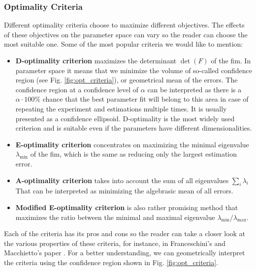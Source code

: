 \documentclass[10pt,A4paper]{article}
\begin{document}
\subsubsection*{Optimality Criteria}
Different optimality criteria choose to maximize different objectives.
The effects of these objectives on the parameter space can vary so the reader can choose the most suitable one. 
Some of the most popular criteria we would like to mention:
\begin{itemize}
    \item \textbf{D-optimality criterion} maximizes the determinant $\det (F)$ of the \ac{fim}. 
    In parameter space it means that we minimize the volume of so-called confidence region (see Fig. \ref{fig:opt_criteria}), or geometrical mean of the errors.
    The confidence region at a confidence level of $\alpha$ can be interpreted as there is a $\alpha \cdot 100 \%$ chance that the best parameter fit will belong to this area in case of repeating the experiment and estimations multiple times.
    It is usually presented as a confidence ellipsoid.
    D-optimality is the most widely used criterion and is suitable even if the parameters have different dimensionalities.
    
    \item \textbf{E-optimality criterion} concentrates on maximizing the minimal eigenvalue $\lambda_{\min}$ of the \ac{fim}, which is the same as reducing only the largest estimation error.
    
    \item \textbf{A-optimality criterion} takes into account the sum of all eigenvalues $\sum_i \lambda_i$
    That can be interpreted as minimizing the algebrasic mean of all errors.
    
    \item \textbf{Modified E-optimality criterion} is also rather promising method that maximizes the ratio between the minimal and maximal eigenvalue $\lambda_{\min} / \lambda_{\max}$.

\end{itemize}
Each of the criteria has its pros and cons so the reader can take a closer look at the various properties of these criteria, for instance, in Franceschini's and Macchietto's paper \cite{franceschiniModelbasedDesignExperiments2008}.
For a better understanding, we can geometrically interpret the criteria using the confidence region shown in Fig. \ref{fig:opt_criteria}.
\end{document}

